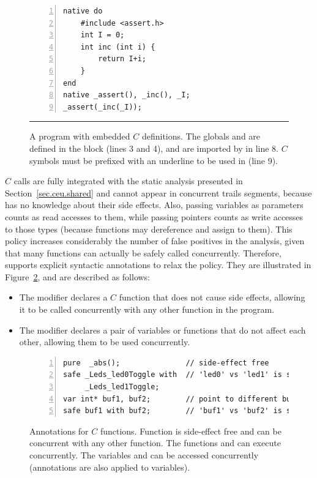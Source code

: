 \begin{figure}[t]
\begin{lstlisting}[numbers=left,xleftmargin=2em]
native do
    #include <assert.h>
    int I = 0;
    int inc (int i) {
        return I+i;
    }
end
native _assert(), _inc(), _I;
_assert(_inc(_I));
\end{lstlisting}
%
\rule{14cm}{0.37pt}
\caption{ A \CEU program with embedded $C$ definitions.
{\small %
The globals  and  are defined in the  block 
(lines 3 and 4), and are imported by \CEU in line 8.
$C$ symbols must be prefixed with an underline to be used in \CEU (line 9).
}%
\label{lst.c}
}
\end{figure}

$C$ calls are fully integrated with the static analysis presented in
Section~\ref{sec.ceu.shared} and cannot appear in concurrent trails segments, 
because \CEU has no knowledge about their side effects.
Also, passing variables as parameters counts as read accesses to them, while 
passing pointers counts as write accesses to those types (because functions may 
dereference and assign to them).
%
This policy increases considerably the number of false positives in the 
analysis, given that many functions can actually be safely called concurrently.
Therefore, \CEU supports explicit syntactic annotations to relax the policy.
They are illustrated in Figure~\ref{lst.annotations}, and are described as 
follows:

\begin{itemize}
\item The  modifier declares a $C$ function that does not cause side 
      effects, allowing it to be called concurrently with any other function in 
the program.
\item The  modifier declares a pair of variables or functions that 
      do not affect each other, allowing them to be used concurrently.
\end{itemize}

%

\begin{figure}[t]
\begin{lstlisting}[numbers=left,xleftmargin=2em]
pure  _abs();               // side-effect free
safe _Leds_led0Toggle with  // 'led0' vs 'led1' is safe
     _Leds_led1Toggle;
var int* buf1, buf2;        // point to different buffers
safe buf1 with buf2;        // 'buf1' vs 'buf2' is safe
\end{lstlisting}
\caption{ Annotations for $C$ functions. \newline
{\small %
Function  is side-effect free and can be concurrent with any other 
function.
The functions  and  can 
execute concurrently.
The variables  and  can be accessed concurrently 
(annotations are also applied to variables).
}%
\label{lst.annotations}
}
\end{figure}

